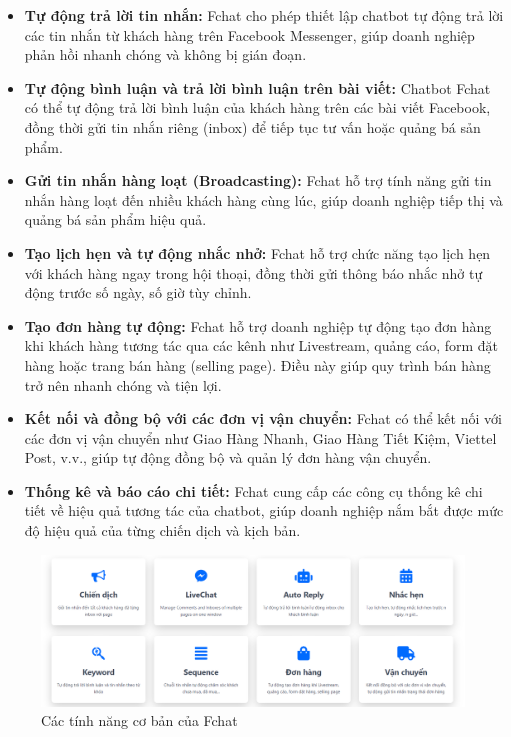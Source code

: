 \begin{itemize}
    \item \textbf{Tự động trả lời tin nhắn:} Fchat cho phép thiết lập chatbot tự động trả lời các tin nhắn từ khách hàng trên Facebook Messenger, giúp doanh nghiệp phản hồi nhanh chóng và không bị gián đoạn.
    
    \item \textbf{Tự động bình luận và trả lời bình luận trên bài viết:} Chatbot Fchat có thể tự động trả lời bình luận của khách hàng trên các bài viết Facebook, đồng thời gửi tin nhắn riêng (inbox) để tiếp tục tư vấn hoặc quảng bá sản phẩm.
    \item \textbf{Gửi tin nhắn hàng loạt (Broadcasting):} Fchat hỗ trợ tính năng gửi tin nhắn hàng loạt đến nhiều khách hàng cùng lúc, giúp doanh nghiệp tiếp thị và quảng bá sản phẩm hiệu quả.

    \item \textbf{Tạo lịch hẹn và tự động nhắc nhở:} Fchat hỗ trợ chức năng tạo lịch hẹn với khách hàng ngay trong hội thoại, đồng thời gửi thông báo nhắc nhở tự động trước số ngày, số giờ tùy chỉnh.

    \item \textbf{Tạo đơn hàng tự động:} Fchat hỗ trợ doanh nghiệp tự động tạo đơn hàng khi khách hàng tương tác qua các kênh như Livestream, quảng cáo, form đặt hàng hoặc trang bán hàng (selling page). Điều này giúp quy trình bán hàng trở nên nhanh chóng và tiện lợi.

    \item \textbf{Kết nối và đồng bộ với các đơn vị vận chuyển:} Fchat có thể kết nối với các đơn vị vận chuyển như Giao Hàng Nhanh, Giao Hàng Tiết Kiệm, Viettel Post, v.v., giúp tự động đồng bộ và quản lý đơn hàng vận chuyển.
    
    \item \textbf{Thống kê và báo cáo chi tiết:} Fchat cung cấp các công cụ thống kê chi tiết về hiệu quả tương tác của chatbot, giúp doanh nghiệp nắm bắt được mức độ hiệu quả của từng chiến dịch và kịch bản.
\end{itemize}
\begin{figure}[H]
    \centering
    \includegraphics[width=1\linewidth]{Images/featurefchat.png}
    \vspace{0.5cm}
    \caption{Các tính năng cơ bản của Fchat}
    \label{fig:enter-label}
\end{figure}
